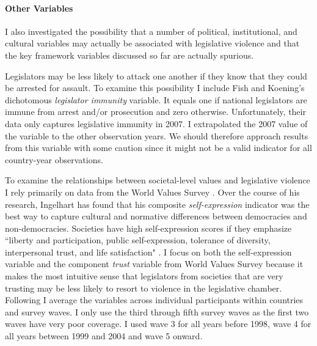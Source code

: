\documentclass[a4paper]{article}\usepackage{graphicx, color}
\begin{document}
\paragraph{Other Variables}

I also investigated the possibility that a number of political, institutional, and cultural variables may actually be associated with legislative violence and that the key framework variables discussed so far are actually spurious. 

Legislators may be less likely to attack one another if they know that they could be arrested for assault. To examine this possibility I include Fish and Koening's \citeyearpar{Fish2009} dichotomous \emph{legislator immunity} variable. It equals one if national legislators are immune from arrest and/or prosecution and zero otherwise. Unfortunately, their data only captures legislative immunity in 2007. I extrapolated the 2007 value of the variable to the other observation years. We should therefore approach results from this variable with some caution since it might not be a valid indicator for all country-year observations.

To examine the relationships between societal-level values and legislative violence I rely primarily on data from the World Values Survey \citep{WVS2009}. Over the course of his research, Ingelhart has found that his composite {\emph{self-expression}} indicator was the best way to capture cultural and normative differences between democracies and non-democracies. Societies have high self-expression scores if they emphasize ``liberty and participation, public self-expression, tolerance of diversity, interpersonal trust, and life satisfaction" \citep[64]{Inglehart2003}. I focus on both the self-expression variable and the component {\emph{trust}} variable from World Values Survey because it makes the most intuitive sense that legislators from societies that are very trusting may be less likely to resort to violence in the legislative chamber. Following \cite{Inglehart2003} I average the variables across individual participants within countries and survey waves. I only use the third through fifth survey waves as the first two waves have very poor coverage. I used wave 3 for all years before 1998, wave 4 for all years between 1999 and 2004 and wave 5 onward. 
\end{document}
